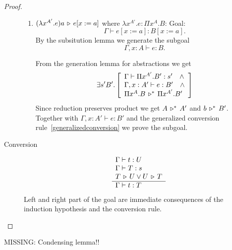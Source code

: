 \begin{theorem}
\begin{proof}
\begin{description}
\begin{enumerate}
      \item $(\lambda x^{A'} .e) a \,\triangleright\, e[x:=a]$ where
        $\lambda x^{A'} .e: \Pi x^A. B$:
        Goal: $$\Gamma \vdash e[x:=a] : B[x:=a].$$
        By the subsitution lemma we
        generate the subgoal $$\Gamma,x:A \vdash e : B.$$

        From the generation lemma for abstractions we get
        $$
        \exists s' B'.
        \left[
          \begin{array}{l}
          \Gamma \vdash\Pi x^{A'}.B' : s' \quad\land
          \\
          \Gamma,x:A' \vdash e:B' \quad\land
          \\
          \Pi x^A. B \,\triangleright^*\, \Pi x^{A'}.B'
          \end{array}
          \right]
        $$
        Since reduction preserves product we get $A \,\triangleright^*\, A'$ and
        $b \,\triangleright^*\, B'$. Together with $\Gamma,x:A' \vdash e:B'$ and the
        generalized conversion rule~\ref{generalizedconversion} we prove the
        subgoal.
      \end{enumerate}


    \item[Conversion]
      $$
      \begin{array}{l}  \Gamma \vdash t : U
        \\
        \Gamma \vdash T : s
        \\
        T \,\triangleright\, U \lor U \,\triangleright\, T
       \\ \hline \Gamma \vdash t: T\end{array}
      $$
      Left and right part of the goal are immediate consequences of the
      induction hypothesis and the conversion rule.
    \end{description}
  \end{proof}
\end{theorem}





MISSING: Condensing lemma!!
